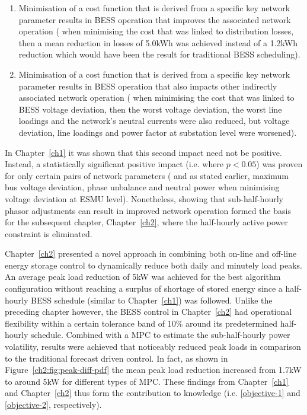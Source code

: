 \begin{enumerate}
	\item Minimisation of a cost function that is derived from a specific key network parameter results in BESS operation that improves the associated network operation ( when minimising the cost that was linked to distribution losses, then a mean reduction in losses of 5.0kWh was achieved instead of a 1.2kWh reduction which would have been the result for traditional BESS scheduling).
	\item Minimisation of a cost function that is derived from a specific key network parameter results in BESS operation that also impacts other indirectly associated network operation ( when minimising the cost that was linked to BESS voltage deviation, then the worst voltage deviation, the worst line loadings and the network's neutral currents were also reduced, but voltage deviation, line loadings and power factor at substation level were worsened).
\end{enumerate}

In Chapter~\ref{ch1} it was shown that this second impact need not be positive.
Instead, a statistically significant positive impact (i.e. where $p<0.05$) was proven for only certain pairs of network parameters ( and as stated earlier, maximum bus voltage deviation, phase unbalance and neutral power when minimising voltage deviation at ESMU level).
Nonetheless, showing that sub-half-hourly phasor adjustments can result in improved network operation formed the basis for the subsequent chapter, Chapter~\ref{ch2}, where the half-hourly active power constraint is eliminated.

Chapter~\ref{ch2} presented a novel approach in combining both on-line and off-line energy storage control to dynamically reduce both daily and minutely load peaks.
An average peak load reduction of 5kW was achieved for the best algorithm configuration without reaching a surplus of shortage of stored energy since a half-hourly BESS schedule (similar to Chapter~\ref{ch1}) was followed.
Unlike the preceding chapter however, the BESS control in Chapter~\ref{ch2} had operational flexibility within a certain tolerance band of 10\% around its predetermined half-hourly schedule.
Combined with a MPC to estimate the sub-half-hourly power volatility, results were achieved that noticeably reduced peak loads in comparison to the traditional forecast driven control.
In fact, as shown in Figure~\ref{ch2:fig:peak-diff-pdf} the mean peak load reduction increased from 1.7kW to around 5kW for different types of MPC.
These findings from Chapter~\ref{ch1} and Chapter~\ref{ch2} thus form the contribution to knowledge (i.e. \ref{objective-1} and \ref{objective-2}, respectively).

